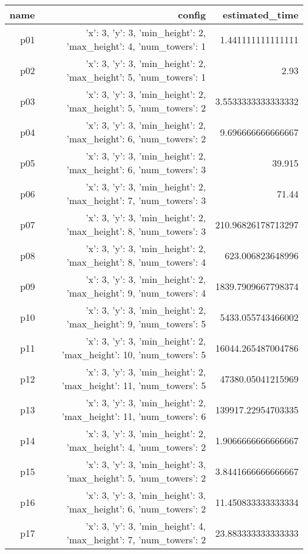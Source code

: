 \documentclass{article}
\begin{document}
                            \begin{center}
                            \scriptsize
                            \begin{tabular}{r|r|r}
                            name & config & estimated\_time\\\midrule
                              p01&{'x': 3, 'y': 3, 'min\_height': 2, 'max\_height': 4, 'num\_towers': 1}&1.441111111111111\\
  p02&{'x': 3, 'y': 3, 'min\_height': 2, 'max\_height': 5, 'num\_towers': 1}&2.93\\
  p03&{'x': 3, 'y': 3, 'min\_height': 2, 'max\_height': 5, 'num\_towers': 2}&3.5533333333333332\\
  p04&{'x': 3, 'y': 3, 'min\_height': 2, 'max\_height': 6, 'num\_towers': 2}&9.696666666666667\\
  p05&{'x': 3, 'y': 3, 'min\_height': 2, 'max\_height': 6, 'num\_towers': 3}&39.915\\
  p06&{'x': 3, 'y': 3, 'min\_height': 2, 'max\_height': 7, 'num\_towers': 3}&71.44\\
  p07&{'x': 3, 'y': 3, 'min\_height': 2, 'max\_height': 8, 'num\_towers': 3}&210.96826178713297\\
  p08&{'x': 3, 'y': 3, 'min\_height': 2, 'max\_height': 8, 'num\_towers': 4}&623.006823648996\\
  p09&{'x': 3, 'y': 3, 'min\_height': 2, 'max\_height': 9, 'num\_towers': 4}&1839.7909667798374\\
  p10&{'x': 3, 'y': 3, 'min\_height': 2, 'max\_height': 9, 'num\_towers': 5}&5433.055743466002\\
  p11&{'x': 3, 'y': 3, 'min\_height': 2, 'max\_height': 10, 'num\_towers': 5}&16044.265487004786\\
  p12&{'x': 3, 'y': 3, 'min\_height': 2, 'max\_height': 11, 'num\_towers': 5}&47380.05041215969\\
  p13&{'x': 3, 'y': 3, 'min\_height': 2, 'max\_height': 11, 'num\_towers': 6}&139917.22954703335\\
  p14&{'x': 3, 'y': 3, 'min\_height': 2, 'max\_height': 4, 'num\_towers': 2}&1.9066666666666667\\
  p15&{'x': 3, 'y': 3, 'min\_height': 3, 'max\_height': 5, 'num\_towers': 2}&3.8441666666666667\\
  p16&{'x': 3, 'y': 3, 'min\_height': 3, 'max\_height': 6, 'num\_towers': 2}&11.450833333333334\\
  p17&{'x': 3, 'y': 3, 'min\_height': 4, 'max\_height': 7, 'num\_towers': 2}&23.883333333333333\\

\end{tabular}
\end{center}
\end{document}
